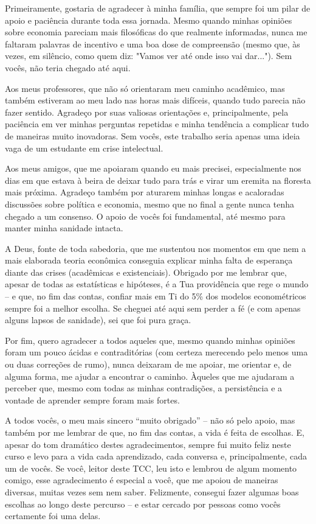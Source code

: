 \begin{agradecimentos}
    Primeiramente, gostaria de agradecer à minha família, que sempre foi um pilar de apoio e paciência durante toda essa jornada. Mesmo quando minhas opiniões sobre economia pareciam mais filosóficas do que realmente informadas, nunca me faltaram palavras de incentivo e uma boa dose de compreensão (mesmo que, às vezes, em silêncio, como quem diz: "Vamos ver até onde isso vai dar..."). Sem vocês, não teria chegado até aqui.

    Aos meus professores, que não só orientaram meu caminho acadêmico, mas também estiveram ao meu lado nas horas mais difíceis, quando tudo parecia não fazer sentido. Agradeço por suas valiosas orientações e, principalmente, pela paciência em ver minhas perguntas repetidas e minha tendência a complicar tudo de maneiras muito inovadoras. Sem vocês, este trabalho seria apenas uma ideia vaga de um estudante em crise intelectual.
    
    Aos meus amigos, que me apoiaram quando eu mais precisei, especialmente nos dias em que estava à beira de deixar tudo para trás e virar um eremita na floresta mais próxima. Agradeço também por aturarem minhas longas e acaloradas discussões sobre política e economia, mesmo que no final a gente nunca tenha chegado a um consenso. O apoio de vocês foi fundamental, até mesmo para manter minha sanidade intacta.

    A Deus, fonte de toda sabedoria, que me sustentou nos momentos em que nem a mais elaborada teoria econômica conseguia explicar minha falta de esperança diante das crises (acadêmicas e existenciais). Obrigado por me lembrar que, apesar de todas as estatísticas e hipóteses, é a Tua providência que rege o mundo – e que, no fim das contas, confiar mais em Ti do 5\% dos modelos econométricos sempre foi a melhor escolha. Se cheguei até aqui sem perder a fé (e com apenas alguns lapsos de sanidade), sei que foi pura graça.
    
    Por fim, quero agradecer a todos aqueles que, mesmo quando minhas opiniões foram um pouco ácidas e contraditórias (com certeza merecendo pelo menos uma ou duas correções de rumo), nunca deixaram de me apoiar, me orientar e, de alguma forma, me ajudar a encontrar o caminho. Àqueles que me ajudaram a perceber que, mesmo com todas as minhas contradições, a persistência e a vontade de aprender sempre foram mais fortes.

    A todos vocês, o meu mais sincero “muito obrigado” – não só pelo apoio, mas também por me lembrar de que, no fim das contas, a vida é feita de escolhas. E, apesar do tom dramático destes agradecimentos, sempre fui muito feliz neste curso e levo para a vida cada aprendizado, cada conversa e, principalmente, cada um de vocês. Se você, leitor deste TCC, leu isto e lembrou de algum momento comigo, esse agradecimento é especial a você, que me apoiou de maneiras diversas, muitas vezes sem nem saber. Felizmente, consegui fazer algumas boas escolhas ao longo deste percurso – e estar cercado por pessoas como vocês certamente foi uma delas.


\end{agradecimentos}
